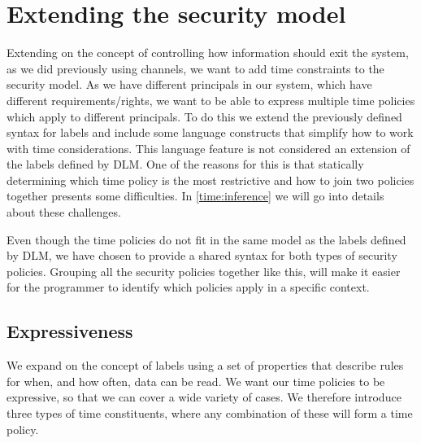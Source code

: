 
\section{Extending the security model}
Extending on the concept of controlling how information should exit the system, as we did previously using channels, we want to add time constraints to the security model.
As we have different principals in our system, which have different requirements/rights, we want to be able to express multiple time policies which apply to different principals.
To do this we extend the previously defined syntax for labels and include some language constructs that simplify how to work with time considerations.
This language feature is not considered an extension of the labels defined by DLM.
One of the reasons for this is that statically determining which time policy is the most restrictive and how to join two policies together presents some difficulties.
In \cref{time:inference} we will go into details about these challenges.

Even though the time policies do not fit in the same model as the labels defined by DLM, we have chosen to provide a shared syntax for both types of security policies.
Grouping all the security policies together like this, will make it easier for the programmer to identify which policies apply in a specific context.

\subsection{Expressiveness}\label{time:expressiveness}
We expand on the concept of labels using a set of properties that describe rules for when, and how often, data can be read.
We want our time policies to be expressive, so that we can cover a wide variety of cases.
We therefore introduce three types of time constituents, where any combination of these will form a time policy.

